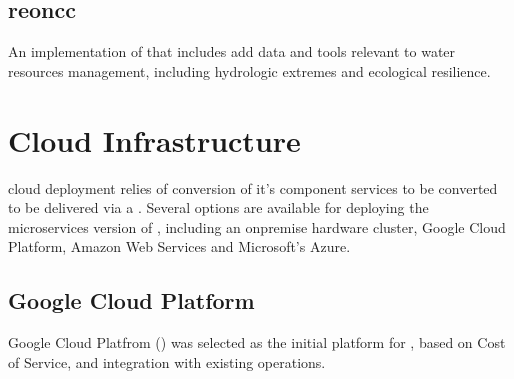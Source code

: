 \documentclass[letterpaper,12pt,english,openany,oneside]{sphinxmanual}
\begin{document}
\sphinxstepscope


\section{reoncc}
\label{\detokenize{euidev/development/_autosummary/reoncc:module-reoncc}}\label{\detokenize{euidev/development/_autosummary/reoncc:reoncc}}\label{\detokenize{euidev/development/_autosummary/reoncc::doc}}
\sphinxAtStartPar
An implementation of  that includes add data and tools relevant to water resources management, including hydrologic extremes and ecological resilience.

\sphinxstepscope


\chapter{Cloud Infrastructure}
\label{\detokenize{euidev/infrastructure/index:cloud-infrastructure}}\label{\detokenize{euidev/infrastructure/index::doc}}
\sphinxAtStartPar
{} cloud deployment relies of conversion of it’s component services to be converted to be delivered via a . Several options are available for deploying the microservices version of , including an on\sphinxhyphen{}premise hardware cluster, Google Cloud Platform, Amazon Web Services and Microsoft’s Azure.


\section{Google Cloud Platform}
\label{\detokenize{euidev/infrastructure/index:google-cloud-platform}}
\sphinxAtStartPar
Google Cloud Platfrom () was selected as the initial platform for , based on Cost of Service, and integration with existing  operations.
\end{document}
